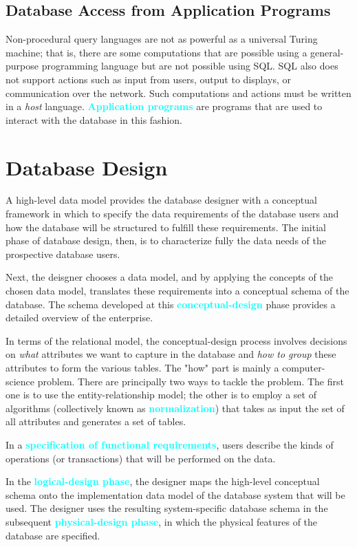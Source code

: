 \documentclass{Beautybook-EN}
\newcommand{\textcy}[1]{\textbf{\textcolor{cyan}{#1}}}
\begin{document}
\subsection{Database Access from Application Programs}

Non-procedural query languages are not as powerful as a universal Turing machine; that is, there are some computations that are possible using a general-purpose programming language but are not possible using SQL. SQL also does not support actions such as input from users, output to displays, or communication over the network. Such computations and actions must be written in a \textit{host} language. \textcy{Application programs} are programs that are used to interact with the database in this fashion.

\section{Database Design}

A high-level data model provides the database designer with a conceptual framework in which to specify the data requirements of the database users and how the database will be structured to fulfill these requirements. The initial phase of database design, then, is to characterize fully the data needs of the prospective database users.

Next, the deisgner chooses a data model, and by applying the concepts of the chosen data model, translates these requirements into a conceptual schema of the database. The schema developed at this \textcy{conceptual-design} phase provides a detailed overview of the enterprise.

In terms of the relational model, the conceptual-design process involves decisions on \textit{what} attributes we want to capture in the database and \textit{how to group} these attributes to form the various tables. The "how" part is mainly a computer-science problem. There are principally two ways to tackle the problem. The first one is to use the entity-relationship model; the other is to employ a set of algorithms (collectively known as \textcy{normalization}) that takes as input the set of all attributes and generates a set of tables.

In a \textcy{specification of functional requirements}, users describe the kinds of operations (or transactions) that will be performed on the data.

In the \textcy{logical-design phase}, the designer maps the high-level conceptual schema onto the implementation data model of the database system that will be used. The designer uses the resulting system-specific database schema in the subsequent \textcy{physical-design phase}, in which the physical features of the database are specified.
\end{document}
